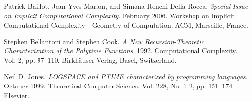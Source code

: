 
\begin{thebibliography}{9} %


Patrick Baillot, Jean-Yves Marion, and Simona Ronchi Della Rocca. \emph{Special
Issue on Implicit Computational Complexity}. February 2006. Workshop on
Implicit Computational Complexity - Geometry of Computation. ACM, Marseille,
France.


Stephen Bellantoni and Stephen Cook. \emph{A New Recursion-Theoretic
Characterization of the Polytime Functions}. 1992. Computational Complexity.
Vol. 2, pp. 97--110. Birkh\"auser Verlag, Basel, Switzerland.


Neil D. Jones. \emph{LOGSPACE and PTIME characterized by programming
languages}.  October 1999. Theoretical Computer Science. Vol. 228, No. 1-2, pp.
151--174. Elsevier.

\end{thebibliography}
